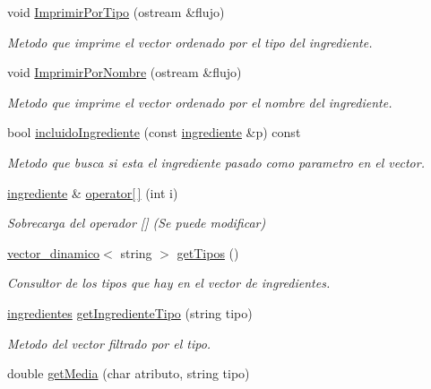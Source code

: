 \begin{DoxyCompactItemize}
void \hyperlink{classingredientes_a683d032576cbc230c210aa51cdbcc93e}{Imprimir\+Por\+Tipo} (ostream \&flujo)
\begin{DoxyCompactList}\small\item\em Metodo que imprime el vector ordenado por el tipo del ingrediente. \end{DoxyCompactList}\item 
void \hyperlink{classingredientes_adefafd151edf8a8997bca2dc22057ece}{Imprimir\+Por\+Nombre} (ostream \&flujo)
\begin{DoxyCompactList}\small\item\em Metodo que imprime el vector ordenado por el nombre del ingrediente. \end{DoxyCompactList}\item 
bool \hyperlink{classingredientes_a6d3f30e2e79299a970c705f61a8ee4d7}{incluido\+Ingrediente} (const \hyperlink{classingrediente}{ingrediente} \&p) const
\begin{DoxyCompactList}\small\item\em Metodo que busca si esta el ingrediente pasado como parametro en el vector. \end{DoxyCompactList}\item 
\hyperlink{classingrediente}{ingrediente} \& \hyperlink{classingredientes_a9e099786f83d0ac3cf38317b194691db}{operator\mbox{[}$\,$\mbox{]}} (int i)
\begin{DoxyCompactList}\small\item\em Sobrecarga del operador \mbox{[}\mbox{]} (Se puede modificar) \end{DoxyCompactList}\item 
\hyperlink{classvector__dinamico}{vector\+\_\+dinamico}$<$ string $>$ \hyperlink{classingredientes_a4fc149d674b55f73c3079d58606e7e1c}{get\+Tipos} ()
\begin{DoxyCompactList}\small\item\em Consultor de los tipos que hay en el vector de ingredientes. \end{DoxyCompactList}\item 
\hyperlink{classingredientes}{ingredientes} \hyperlink{classingredientes_a160ecb07facb16cbe7369ea797c67549}{get\+Ingrediente\+Tipo} (string tipo)
\begin{DoxyCompactList}\small\item\em Metodo del vector filtrado por el tipo. \end{DoxyCompactList}\item 
double \hyperlink{classingredientes_aa124bb75b0ff0b233d313fce58668868}{get\+Media} (char atributo, string tipo)

\end{DoxyCompactItemize}
